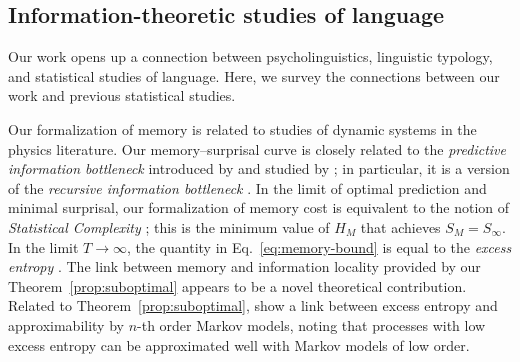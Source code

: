 

\subsection{Information-theoretic studies of language}\label{sec:disc:infotheory}

Our work opens up a connection between psycholinguistics, linguistic typology, and statistical studies of language. Here, we survey the connections between our work and previous statistical studies.



Our formalization of memory is related to studies of dynamic systems in the physics literature.
Our memory--surprisal curve is closely related to the \emph{predictive information bottleneck} introduced by \citet{still-information-2014} and studied by \citet{marzen-predictive-2016}; in particular, it is a version of the \emph{recursive information bottleneck} \citep[][\S 4]{still-information-2014}. 
In the limit of optimal prediction and minimal surprisal, our formalization of memory cost is equivalent to the notion of \emph{Statistical Complexity} \citep{crutchfield-inferring-1989,shalizi2001computational}; this is the minimum value of $H_M$ that achieves $S_M = S_\infty$.
In the limit $T \rightarrow \infty$, the quantity in Eq.~\ref{eq:memory-bound} is equal to the \emph{excess entropy} \citep{crutchfield-inferring-1989}.
The link between memory and information locality provided by our Theorem~\ref{prop:suboptimal} appears to be a novel theoretical contribution.
Related to Theorem~\ref{prop:suboptimal}, \citet{sharan-prediction-2016} show a link between excess entropy and approximability by $n$-th order Markov models, noting that processes with low excess entropy can be approximated well with Markov models of low order.

